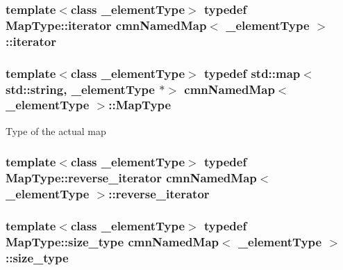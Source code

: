 \subsubsection[{iterator}]{\setlength{\rightskip}{0pt plus 5cm}template$<$class \+\_\+element\+Type$>$ typedef Map\+Type\+::iterator {\bf cmn\+Named\+Map}$<$ \+\_\+element\+Type $>$\+::{\bf iterator}}\label{classcmn_named_map_a0ad463b349c3c95e8f639e12f492765e}
\hypertarget{classcmn_named_map_a35919ad9cccf3e060063b489db663425}{}
\subsubsection[{Map\+Type}]{\setlength{\rightskip}{0pt plus 5cm}template$<$class \+\_\+element\+Type$>$ typedef std\+::map$<$std\+::string, \+\_\+element\+Type $\ast$$>$ {\bf cmn\+Named\+Map}$<$ \+\_\+element\+Type $>$\+::{\bf Map\+Type}}\label{classcmn_named_map_a35919ad9cccf3e060063b489db663425}
Type of the actual map \hypertarget{classcmn_named_map_abfbc3bd1bf3e0ea32fcdf61db4377014}{}
\subsubsection[{reverse\+\_\+iterator}]{\setlength{\rightskip}{0pt plus 5cm}template$<$class \+\_\+element\+Type$>$ typedef Map\+Type\+::reverse\+\_\+iterator {\bf cmn\+Named\+Map}$<$ \+\_\+element\+Type $>$\+::{\bf reverse\+\_\+iterator}}\label{classcmn_named_map_abfbc3bd1bf3e0ea32fcdf61db4377014}
\hypertarget{classcmn_named_map_aaaf5963f1e9b26efb08e7f0cd7199335}{}
\subsubsection[{size\+\_\+type}]{\setlength{\rightskip}{0pt plus 5cm}template$<$class \+\_\+element\+Type$>$ typedef Map\+Type\+::size\+\_\+type {\bf cmn\+Named\+Map}$<$ \+\_\+element\+Type $>$\+::{\bf size\+\_\+type}}\label{classcmn_named_map_aaaf5963f1e9b26efb08e7f0cd7199335}
\hypertarget{classcmn_named_map_a78add53bc0e9b925dc3c5ec981994d2b}{}
